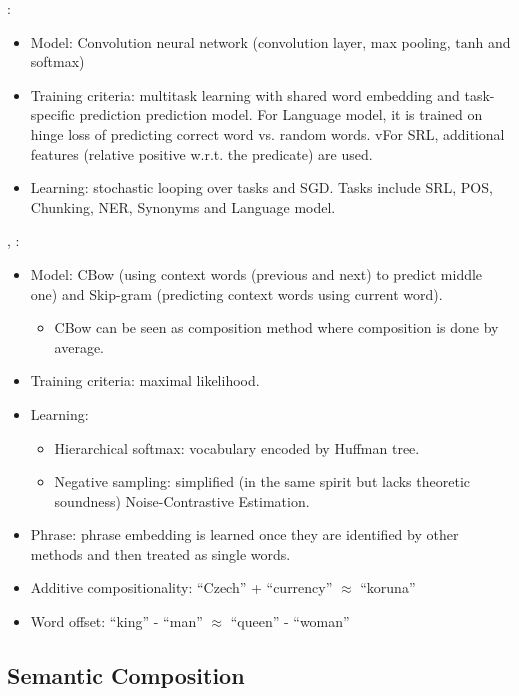 \documentclass{article} %
\begin{document}
\cite{collobert2008unified}:
\begin{itemize}
\item Model: Convolution neural network (convolution layer, max pooling,
             $\mathrm{tanh}$ and softmax)
\item Training criteria: multitask learning with shared word embedding and
    task-specific prediction prediction model. For Language model, it is
    trained on hinge loss of predicting correct word vs. random words. vFor
    SRL, additional features (relative positive w.r.t. the predicate) are
    used.
\item Learning: stochastic looping over tasks and SGD. Tasks include SRL, POS,
    Chunking, NER, Synonyms and Language model.
\end{itemize}

\cite{mikolov2013efficient}, \cite{mikolov2013distributed}:
\begin{itemize}
\item Model: CBow (using context words (previous and next) to predict middle
    one) and Skip-gram (predicting context words using current word).
   	\begin{itemize}
   	\item CBow can be seen as composition method where composition is done by
   	average.
   	\end{itemize}
\item Training criteria: maximal likelihood.
\item Learning:
	\begin{itemize}
	\item Hierarchical softmax: vocabulary encoded by Huffman tree.
	\item Negative sampling: simplified (in the same spirit but lacks theoretic
			soundness) Noise-Contrastive Estimation.
	\end{itemize}
\item Phrase: phrase embedding is learned once they are identified by other
	methods and then treated as single words.
\item Additive compositionality: ``Czech'' + ``currency'' $\approx$ ``koruna''
\item Word offset: ``king'' - ``man'' $\approx$ ``queen'' - ``woman''
\end{itemize}

\subsection{Semantic Composition}
\end{document}
